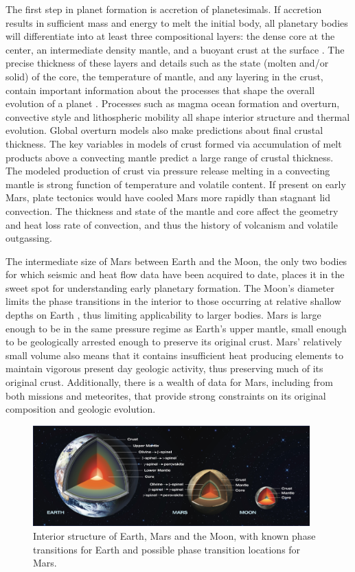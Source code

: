 The first step in planet formation is accretion of planetesimals.  If accretion results in sufficient mass and energy to melt the initial body, all planetary bodies will differentiate into at least three compositional layers:  the dense core at the center, an intermediate density mantle, and a buoyant crust at the surface \citep{Elkins-Tanton2011a}.  The precise thickness of these layers and details such as the state (molten and/or solid) of the core, the temperature of mantle, and any layering in the crust, contain important information about the processes that shape the overall evolution of a planet \citep{Mocquet2011}.  Processes such as magma ocean formation and overturn, convective style and lithospheric mobility all shape interior structure and thermal evolution.  Global overturn models also make predictions about final crustal thickness.  The key variables in models of crust formed via accumulation of melt products above a convecting mantle predict a large range of crustal thickness.  The modeled production of crust via pressure release melting in a convecting mantle is strong function of temperature and volatile content.   If present on early Mars, plate tectonics would have cooled Mars more rapidly than stagnant lid convection. The thickness and state of the mantle and core affect the geometry and heat loss rate of convection, and thus the history of volcanism and volatile outgassing.

The intermediate size of Mars between Earth and the Moon, the only two bodies for which seismic and heat flow data have been acquired to date, places it in the sweet spot for understanding early planetary formation. The Moon's diameter limits the phase transitions in the interior to those occurring at relative shallow depths on Earth \citep{Khan_etal13, Kuskov2014}, thus limiting applicability to larger bodies. Mars is large enough to be in the same pressure regime as Earth’s upper mantle, small enough to be geologically arrested enough to preserve its original crust.  Mars’ relatively small volume also means that it contains insufficient heat producing elements to maintain vigorous present day geologic activity, thus preserving much of its original crust. Additionally, there is a wealth of data for Mars, including from both missions and meteorites, that provide strong constraints on its original composition and geologic evolution. 
\begin{figure}[h!]
\begin{center}
\includegraphics[width=0.95\textwidth]
{figures/Fig1_1.png}
\caption{Interior structure of Earth, Mars and the Moon, with known phase transitions for Earth and possible phase transition locations for Mars.}
\label{fig:Fig1_1.png} 
\end{center}
\end{figure}

